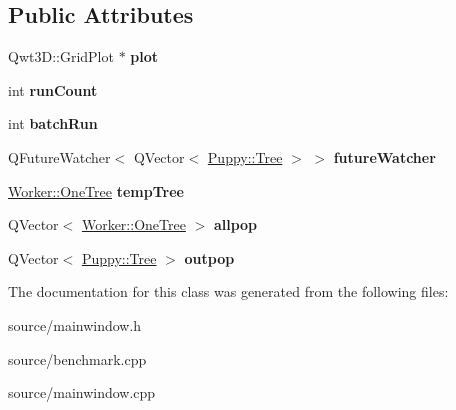 \subsection*{Public Attributes}
\begin{DoxyCompactItemize}
\item 
\hypertarget{classMainWindow_a8a5d5f218964eaa481e774b56d99b257}{}Qwt3\+D\+::\+Grid\+Plot $\ast$ {\bfseries plot}\label{classMainWindow_a8a5d5f218964eaa481e774b56d99b257}

\item 
\hypertarget{classMainWindow_a576eb30972250aad507588f806458ae3}{}int {\bfseries run\+Count}\label{classMainWindow_a576eb30972250aad507588f806458ae3}

\item 
\hypertarget{classMainWindow_a88110b77c2e35f2264b5cac62f59947e}{}int {\bfseries batch\+Run}\label{classMainWindow_a88110b77c2e35f2264b5cac62f59947e}

\item 
\hypertarget{classMainWindow_aca92ba16d73ac4d621564d6a894aaf6a}{}Q\+Future\+Watcher$<$ Q\+Vector$<$ \hyperlink{classPuppy_1_1Tree}{Puppy\+::\+Tree} $>$ $>$ {\bfseries future\+Watcher}\label{classMainWindow_aca92ba16d73ac4d621564d6a894aaf6a}

\item 
\hypertarget{classMainWindow_a8afe9c18906c2375f2680cc0db63bb87}{}\hyperlink{structWorker_1_1OneTree}{Worker\+::\+One\+Tree} {\bfseries temp\+Tree}\label{classMainWindow_a8afe9c18906c2375f2680cc0db63bb87}

\item 
\hypertarget{classMainWindow_a1f255e88b4b9f1fff19b78ffabac5186}{}Q\+Vector$<$ \hyperlink{structWorker_1_1OneTree}{Worker\+::\+One\+Tree} $>$ {\bfseries allpop}\label{classMainWindow_a1f255e88b4b9f1fff19b78ffabac5186}

\item 
\hypertarget{classMainWindow_a45e011664a91877766b8ddd3359509a7}{}Q\+Vector$<$ \hyperlink{classPuppy_1_1Tree}{Puppy\+::\+Tree} $>$ {\bfseries outpop}\label{classMainWindow_a45e011664a91877766b8ddd3359509a7}

\end{DoxyCompactItemize}


The documentation for this class was generated from the following files\+:\begin{DoxyCompactItemize}
\item 
source/mainwindow.\+h\item 
source/benchmark.\+cpp\item 
source/mainwindow.\+cpp\end{DoxyCompactItemize}
